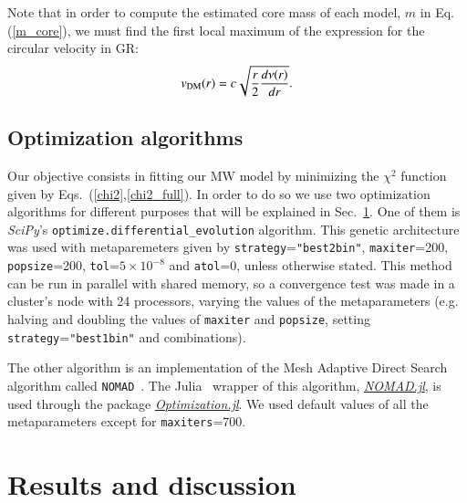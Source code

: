 \documentclass[twocolumn]{aa}
\begin{document}
Note that in order to compute the estimated core mass of each model, $m$ in Eq.(\ref{m_core}),
we must find the first local maximum of the expression for the circular velocity in GR:
\begin{equation}
   \label{v_circ_dm}
   v_{\rm{DM}}(r)= c\sqrt{\frac{r}{2}\frac{d\nu(r)}{dr}}.
\end{equation}

\subsection{Optimization algorithms}
\label{sec:optimization}

Our objective consists in fitting our MW model by minimizing the $\chi^2$ function given by Eqs.~(\ref{chi2},\ref{chi2_full}).  In order to do so we use two optimization algorithms for different purposes
that will be explained in Sec.~\ref{sec:results}.
One of them is {\it SciPy}'s
\texttt{optimize.differential\_evolution} algorithm. This genetic architecture
was used with metaparemeters given by
\texttt{strategy}=\texttt{"best2bin"}, \texttt{maxiter}=200, \texttt{popsize}=200,
\texttt{tol}=$5\times10^{-8}$ and \texttt{atol}=0, unless otherwise stated. This method can be run in parallel with shared memory,
so a convergence test was made in a cluster's node with 24 processors, varying the values of the metaparameters (e.g. halving and doubling the values of \texttt{maxiter} and \texttt{popsize}, setting \texttt{strategy}=\texttt{"best1bin"} and combinations).

The other algorithm is an implementation of the Mesh Adaptive Direct Search algorithm called
\texttt{NOMAD}~\citep{audet2021nomad}. The {\sc Julia}~\citep{bezanson2017julia}
wrapper of this algorithm, \href{https://bbopt.github.io/NOMAD.jl/stable/}{\it NOMAD.jl},
is used through the package \href{https://docs.sciml.ai/Optimization/stable/}{\it Optimization.jl}.
We used default values of all the metaparameters except for \texttt{maxiters}=700.




\section{Results and discussion}
\label{sec:results}
\end{document}
